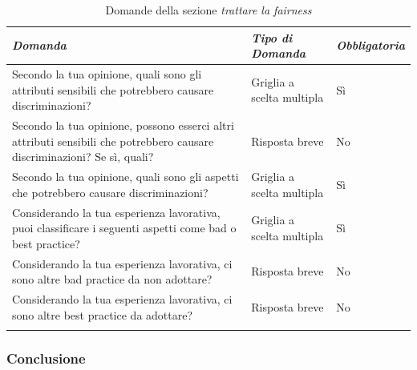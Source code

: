 \begin{longtable}{| p{} | p{} | p{} |} 
\hline\textbf{\textit{Domanda}} & \textbf{\textit{Tipo di Domanda}} & \textbf{\textit{Obbligatoria}}\\
\hline
\endhead 

\hline 
Secondo la tua opinione, quali sono gli attributi sensibili che potrebbero causare discriminazioni?

& Griglia a scelta multipla

& Sì 

\\ \hline
\rowcolor{Gray!30}
Secondo la tua opinione, possono esserci altri attributi sensibili che potrebbero causare discriminazioni? Se sì, quali?

& Risposta breve

& No

\\ \hline
Secondo la tua opinione, quali sono gli aspetti che potrebbero causare discriminazioni?

& Griglia a scelta multipla

& Sì 

\\ \hline
\rowcolor{Gray!30}
Considerando la tua esperienza lavorativa, puoi classificare i seguenti aspetti come bad o best practice?

& Griglia a scelta multipla

& Sì 

\\ \hline
Considerando la tua esperienza lavorativa, ci sono altre bad practice da non adottare?

&  Risposta breve

& No

\\ \hline
\rowcolor{Gray!30}
Considerando la tua esperienza lavorativa, ci sono altre best practice da adottare?

& Risposta breve

& No

\\ \hline
\caption{Domande della sezione \emph{trattare la fairness}} %
\label{tab:myfirstlongtable}
\end{longtable}

\subsubsection{Conclusione}

